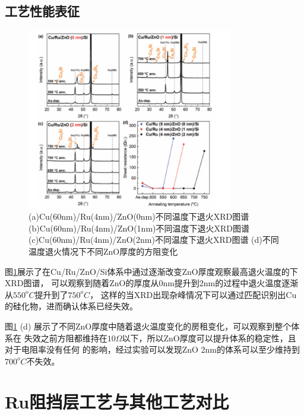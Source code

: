 \documentclass[UTF8,a4paper,12pt]{ctexart}%
\begin{document}
\subsection{工艺性能表征}


\begin{figure}[htb]
	\centering
	\includegraphics[width=0.8\textwidth]{26.jpg}
	\caption{(a)Cu(60nm)/Ru(4nm)/ZnO(0nm)不同温度下退火XRD图谱 (b)Cu(60nm)/Ru(4nm)/ZnO(1nm)不同温度下退火XRD图谱 
	(c)Cu(60nm)/Ru(4nm)/ZnO(2nm)不同温度下退火XRD图谱 (d)不同温度退火情况下不同ZnO厚度的方阻变化}
	\label{Fig:26}
\end{figure}


图\ref{Fig:26}展示了在Cu/Ru/ZnO/Si体系中通过逐渐改变ZnO厚度观察最高退火温度的下XRD图谱，
可以观察到随着ZnO的厚度从0nm提升到2nm的过程中退火温度逐渐从$550^oC$提升到了$750^oC$，
这样的当XRD出现杂峰情况下可以通过匹配识别出Cu的硅化物，进而确认体系已经失效。


图\ref{Fig:26} (d) 展示了不同ZnO厚度中随着退火温度变化的房租变化，可以观察到整个体系在
失效之前方阻都维持在$10 \Omega$以下，所以ZnO厚度可以提升体系的稳定性，且对于电阻率没有任何
的影响，经过实验可以发现ZnO 2nm的体系可以至少维持到$700^oC$不失效。



\section{Ru阻挡层工艺与其他工艺对比}
\end{document}
